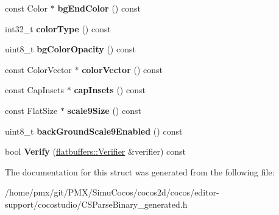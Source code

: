 \begin{DoxyCompactItemize}
\item 
\mbox{\label{structflatbuffers_1_1PanelOptions_abd0dd1f22cfa2c26c690f6fa8489f60b}} 
const Color $\ast$ {\bfseries bg\+End\+Color} () const
\item 
\mbox{\label{structflatbuffers_1_1PanelOptions_af9c6359128dd78592c3ad150c4183551}} 
int32\+\_\+t {\bfseries color\+Type} () const
\item 
\mbox{\label{structflatbuffers_1_1PanelOptions_a5d212cbd11258705e4f34b60cf6b821c}} 
uint8\+\_\+t {\bfseries bg\+Color\+Opacity} () const
\item 
\mbox{\label{structflatbuffers_1_1PanelOptions_a142bab7ec0a45203380d0bb714902a60}} 
const Color\+Vector $\ast$ {\bfseries color\+Vector} () const
\item 
\mbox{\label{structflatbuffers_1_1PanelOptions_a903ba709317e61ffb6161507b4cb2ca2}} 
const Cap\+Insets $\ast$ {\bfseries cap\+Insets} () const
\item 
\mbox{\label{structflatbuffers_1_1PanelOptions_a411343c1d8d9537121b6b49bbe2fddf9}} 
const Flat\+Size $\ast$ {\bfseries scale9\+Size} () const
\item 
\mbox{\label{structflatbuffers_1_1PanelOptions_a50ffdca77b843dccb779935f2e15d9f4}} 
uint8\+\_\+t {\bfseries back\+Ground\+Scale9\+Enabled} () const
\item 
\mbox{\label{structflatbuffers_1_1PanelOptions_a69f32d97e6ed88697177033ef92ebc5a}} 
bool {\bfseries Verify} (\hyperlink{classflatbuffers_1_1Verifier}{flatbuffers\+::\+Verifier} \&verifier) const
\end{DoxyCompactItemize}


The documentation for this struct was generated from the following file\+:\begin{DoxyCompactItemize}
\item 
/home/pmx/git/\+P\+M\+X/\+Simu\+Cocos/cocos2d/cocos/editor-\/support/cocostudio/C\+S\+Parse\+Binary\+\_\+generated.\+h\end{DoxyCompactItemize}
